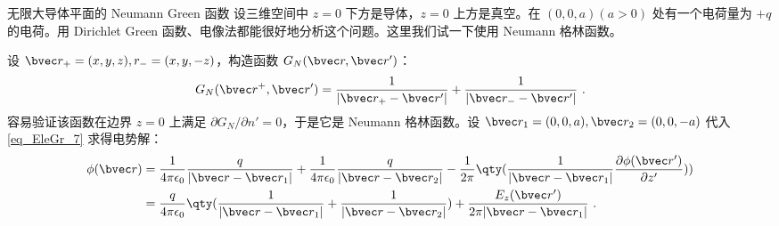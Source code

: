 \begin{example}{无限大导体平面的 Neumann Green 函数}
设三维空间中 $z=0$ 下方是导体，$z=0$ 上方是真空。在 $(0,0,a)(a>0)$ 处有一个电荷量为 $+q$ 的电荷。用 Dirichlet Green 函数、电像法都能很好地分析这个问题。这里我们试一下使用 Neumann 格林函数。

设 $\bvec r_+=(x,y,z),r_-=(x,y,-z)$，构造函数 $G_N(\bvec r,\bvec r')$：
\begin{equation}
G_N(\bvec r^+,\bvec r')=\frac{1}{|\bvec r_+-\bvec r'|}+\frac{1}{|\bvec r_--\bvec r'|}~.
\end{equation}
容易验证该函数在边界 $z=0$ 上满足 $\partial G_N/\partial n'=0$，于是它是 Neumann 格林函数。设 $\bvec r_1=(0,0,a),\bvec r_2=(0,0,-a)$ 代入\autoref{eq_EleGr_7} 求得电势解：
\begin{equation}
\begin{aligned}
\phi(\bvec r)&=\frac{1}{4\pi\epsilon_0}\frac{q}{|\bvec r-\bvec r_1|}+\frac{1}{4\pi\epsilon_0}\frac{q}{|\bvec r-\bvec r_2|}-\frac{1}{2\pi}\qty(\frac{1}{|\bvec r-\bvec r_1|}\frac{\partial \phi(\bvec r')}{\partial z'}))\\
&=\frac{q}{4\pi\epsilon_0}\qty(\frac{1}{|\bvec r-\bvec r_1|}+\frac{1}{|\bvec r-\bvec r_2|})+\frac{E_z(\bvec r')}{2\pi|\bvec r-\bvec r_1|}~.
\end{aligned}
\end{equation}

\end{example}
